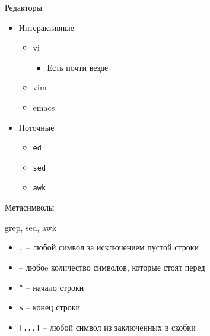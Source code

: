 \begin{frame}{Редакторы}
\begin{itemize}
 \item Интерактивные
 \begin{itemize}
 \item vi
   \begin{itemize}
    \item Есть почти везде
   \end{itemize}
 \item vim
 \item emacs
 \end{itemize}
 \item Поточные
	 \begin{itemize}
		 \item {\tt ed}
		 \item {\tt sed}
		 \item {\tt awk}
	\end{itemize}
 \end{itemize}
\end{frame}

\begin{frame}[fragile]{Метасимволы}
	\begin{block}{grep, sed, awk}
	\end{block}
	\begin{itemize}
		\item {\tt .} -- любой символ за исключением пустой строки
		\item {\tt *} -- любоe количество символов, которые стоят перед {\tt *}
		\item {\tt \^{}} -- начало строки
		\item {\tt \$} -- конец строки
		\item {\tt [...]} -- любой символ из заключенных в скобки
	\end{itemize}
\end{frame}

